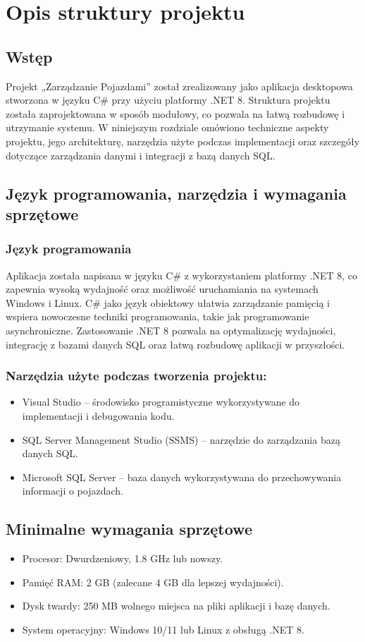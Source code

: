 ﻿%
\chapter{Opis struktury projektu}
\section{Wstęp}
Projekt „Zarządzanie Pojazdami” został zrealizowany jako aplikacja desktopowa stworzona w języku C\# przy użyciu platformy .NET 8. Struktura projektu została zaprojektowana w sposób modułowy, co pozwala na łatwą rozbudowę i utrzymanie systemu. W niniejszym rozdziale omówiono techniczne aspekty projektu, jego architekturę, narzędzia użyte podczas implementacji oraz szczegóły dotyczące zarządzania danymi i integracji z bazą danych SQL.

\section{Język programowania, narzędzia i wymagania sprzętowe}
\subsection*{Język programowania}  
Aplikacja została napisana w języku C\# z wykorzystaniem platformy .NET 8, co zapewnia wysoką wydajność oraz możliwość uruchamiania na systemach Windows i Linux. C\# jako język obiektowy ułatwia zarządzanie pamięcią i wspiera nowoczesne techniki programowania, takie jak programowanie asynchroniczne. Zastosowanie .NET 8 pozwala na optymalizację wydajności, integrację z bazami danych SQL oraz łatwą rozbudowę aplikacji w przyszłości.%
\subsection*{Narzędzia użyte podczas tworzenia projektu:} 
\begin{itemize}
    \item Visual Studio – środowisko programistyczne wykorzystywane do implementacji i debugowania kodu.
    \item SQL Server Management Studio (SSMS) – narzędzie do zarządzania bazą danych SQL.
    \item Microsoft SQL Server – baza danych wykorzystywana do przechowywania informacji o pojazdach.
\end{itemize}
\section{Minimalne wymagania sprzętowe}
\begin{itemize}
    \item Procesor: Dwurdzeniowy, 1.8 GHz lub nowszy.
    \item Pamięć RAM: 2 GB (zalecane 4 GB dla lepszej wydajności).
    \item Dysk twardy: 250 MB wolnego miejsca na pliki aplikacji i bazę danych.
    \item System operacyjny: Windows 10/11 lub Linux z obsługą .NET 8.
\end{itemize}
